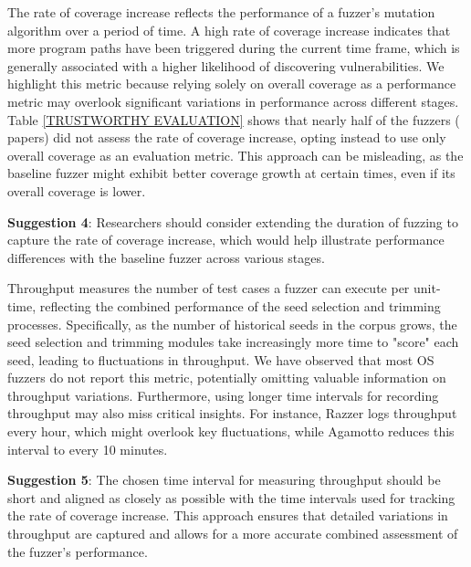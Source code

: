 The rate of coverage increase reflects the performance of a fuzzer's mutation algorithm over a period of time. A high rate of coverage increase indicates that more program paths have been triggered during the current time frame, which is generally associated with a higher likelihood of discovering vulnerabilities. We highlight this metric because relying solely on overall coverage as a performance metric may overlook significant variations in performance across different stages. Table \ref{TRUSTWORTHY EVALUATION} shows that nearly half of the fuzzers ( papers) did not assess the rate of coverage increase, opting instead to use only overall coverage as an evaluation metric. This approach can be misleading, as the baseline fuzzer might exhibit better coverage growth at certain times, even if its overall coverage is lower.
\begin{tcolorbox}[colback=gray!10!white, colframe=black,left=-0cm, right=-0cm, top=-0cm, bottom=-0cm]
\textbf{Suggestion 4}: Researchers should consider extending the duration of fuzzing to capture the rate of coverage increase, which would help illustrate performance differences with the baseline fuzzer across various stages.
\end{tcolorbox}


Throughput measures the number of test cases a fuzzer can execute per unit-time, reflecting the combined performance of the seed selection and trimming processes. Specifically, as the number of historical seeds in the corpus grows, the seed selection and trimming modules take increasingly more time to "score" each seed, leading to fluctuations in throughput.  We have observed that most OS fuzzers do not report this metric, potentially omitting valuable information on throughput variations. Furthermore, using longer time intervals for recording throughput may also miss critical insights. For instance, Razzer \cite{jeong2019razzer} logs throughput every hour, which might overlook key fluctuations, while Agamotto \cite{song2020agamotto} reduces this interval to every 10 minutes.
\begin{tcolorbox}[colback=gray!10!white, colframe=black,left=-0cm, right=-0cm, top=-0cm, bottom=-0cm]
\textbf{Suggestion 5}: The chosen time interval for measuring throughput should be short and aligned as closely as possible with the time intervals used for tracking the rate of coverage increase. This approach ensures that detailed variations in throughput are captured and allows for a more accurate combined assessment of the fuzzer's performance.
\end{tcolorbox}
